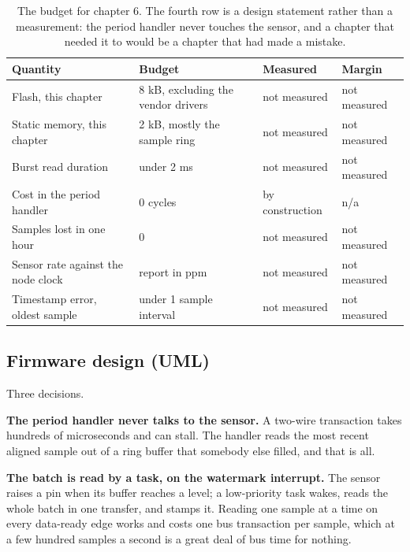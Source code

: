 \begin{table}[H]\centering\small
\begin{tabular}{p{44mm}p{28mm}p{28mm}p{30mm}}
\toprule
Quantity & Budget & Measured & Margin \\
\midrule
Flash, this chapter & 8 kB, excluding the vendor drivers & not measured & not measured \\
Static memory, this chapter & 2 kB, mostly the sample ring & not measured & not measured \\
Burst read duration & under 2 ms & not measured & not measured \\
Cost in the period handler & 0 cycles & by construction & n/a \\
Samples lost in one hour & 0 & not measured & not measured \\
Sensor rate against the node clock & report in ppm & not measured & not measured \\
Timestamp error, oldest sample & under 1 sample interval & not measured & not measured \\
\bottomrule
\end{tabular}
\caption{The budget for chapter 6. The fourth row is a design statement rather than a measurement: the period handler never touches the sensor, and a chapter that needed it to would be a chapter that had made a mistake.}
\end{table}

\subsection*{Firmware design (UML)}


Three decisions.

\textbf{The period handler never talks to the sensor.} A two-wire transaction
takes hundreds of microseconds and can stall. The handler reads the most recent
aligned sample out of a ring buffer that somebody else filled, and that is all.

\textbf{The batch is read by a task, on the watermark interrupt.} The sensor
raises a pin when its buffer reaches a level; a low-priority task wakes, reads
the whole batch in one transfer, and stamps it. Reading one sample at a time on
every data-ready edge works and costs one bus transaction per sample, which at a
few hundred samples a second is a great deal of bus time for nothing.

